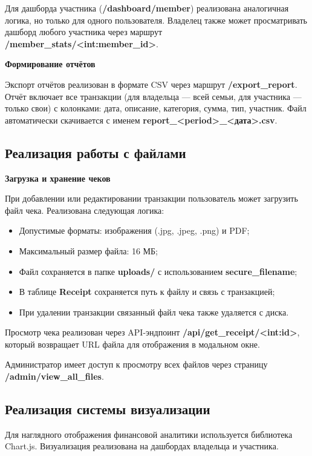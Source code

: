 Для дашборда участника (\textbf{/dashboard/member}) реализована аналогичная логика, но только для одного пользователя. Владелец также может просматривать дашборд любого участника через маршрут \textbf{/member\_stats/<int:member\_id>}.

\textbf{Формирование отчётов}

Экспорт отчётов реализован в формате CSV через маршрут \textbf{/export\_report}. Отчёт включает все транзакции (для владельца --- всей семьи, для участника --- только свои) с колонками: дата, описание, категория, сумма, тип, участник. Файл автоматически скачивается с именем \textbf{report\_<period>\_<дата>.csv}.


\subsection{Реализация работы с файлами}

\textbf{Загрузка и хранение чеков}

При добавлении или редактировании транзакции пользователь может загрузить файл чека. Реализована следующая логика:
\begin{itemize}
    \item Допустимые форматы: изображения (.jpg, .jpeg, .png) и PDF;
    \item Максимальный размер файла: 16 МБ;
    \item Файл сохраняется в папке \textbf{uploads/} с использованием \textbf{secure\_filename};
    \item В таблице \textbf{Receipt} сохраняется путь к файлу и связь с транзакцией;
    \item При удалении транзакции связанный файл чека также удаляется с диска.
\end{itemize}

Просмотр чека реализован через API-эндпоинт \textbf{/api/get\_receipt/<int:id>}, который возвращает URL файла для отображения в модальном окне. 

Администратор имеет доступ к просмотру всех файлов через страницу \textbf{/admin/view\_all\_files}.


\subsection{Реализация системы визуализации}

Для наглядного отображения финансовой аналитики используется библиотека Chart.js. Визуализация реализована на дашбордах владельца и участника.

